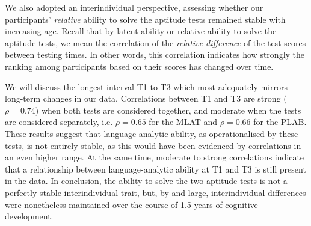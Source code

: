 \documentclass[output=paper]{langsci/langscibook}
\begin{document}
We also adopted an interindividual perspective, assessing whether our participants’ \textit{relative} ability to solve the aptitude tests remained stable with increasing age. Recall that by latent ability or relative ability to solve the aptitude tests, we mean the correlation of the \textit{relative difference} of the test scores between testing times. In other words, this correlation indicates how strongly the ranking among participants based on their scores has changed over time. 

We will discuss the longest interval T1 to T3 which most adequately mirrors long-term changes in our data. Correlations between T1 and T3 are strong ($\rho = 0.74$) when both tests are considered together, and moderate when the tests are considered separately, i.e. $\rho = 0.65$ for the MLAT and $\rho = 0.66$ for the PLAB. These results suggest that language-analytic ability, as operationalised by these tests, is not entirely stable, as this would have been evidenced by correlations in an even higher range. At the same time, moderate to strong correlations indicate that a relationship between language-analytic ability at T1 and T3 is still present in the data. In conclusion, the ability to solve the two aptitude tests is not a perfectly stable interindividual trait, but, by and large, interindividual differences were nonetheless maintained over the course of 1.5 years of cognitive development.


{\sloppy\printbibliography[heading=subbibliography,notkeyword=this]}
\end{document}
